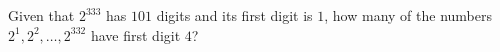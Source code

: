 Given that $2^{333}$ has $101$ digits and its first digit is $1$, how many of the numbers $2^1,2^2,\dots,2^{332}$ have first digit $4$?
